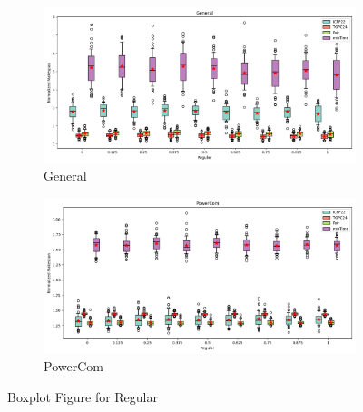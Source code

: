 \documentclass{article}
\begin{document}
\begin{figure}[htbp]
\\[2ex]
\begin{subfigure}[b]{0.32\textwidth}\includegraphics[width=\textwidth]{Results/Regular/Regular_General_boxplot}\caption{General}\label{fig:boxplot_figures_Regular_General}\end{subfigure}
\hfill
\begin{subfigure}[b]{0.32\textwidth}\includegraphics[width=\textwidth]{Results/Regular/Regular_PowerCom_boxplot}\caption{PowerCom}\label{fig:boxplot_figures_Regular_PowerCom}\end{subfigure}
\hfill
\caption{Boxplot Figure for Regular}
\label{fig:boxplot_figures_Regular}
\end{figure}
\end{document}
